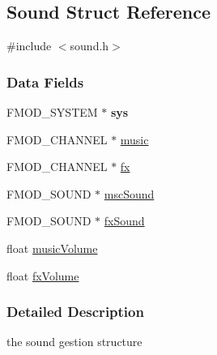 \hypertarget{struct_sound}{\subsection{Sound Struct Reference}
\label{struct_sound}
}


{\ttfamily \#include $<$sound.\-h$>$}

\subsubsection*{Data Fields}
\begin{DoxyCompactItemize}
\item 
\hypertarget{struct_sound_ae043bb23ee313709e1c605dd6c06d317}{F\-M\-O\-D\-\_\-\-S\-Y\-S\-T\-E\-M $\ast$ {\bfseries sys}}\label{struct_sound_ae043bb23ee313709e1c605dd6c06d317}

\item 
F\-M\-O\-D\-\_\-\-C\-H\-A\-N\-N\-E\-L $\ast$ \hyperlink{struct_sound_acca26c408c6140c8cdc0d8f49d31ad4a}{music}
\item 
F\-M\-O\-D\-\_\-\-C\-H\-A\-N\-N\-E\-L $\ast$ \hyperlink{struct_sound_a259d72174e26b5bb58146484cd54c1c8}{fx}
\item 
F\-M\-O\-D\-\_\-\-S\-O\-U\-N\-D $\ast$ \hyperlink{struct_sound_a1051e4654836160d314f8d49fe85ae77}{msc\-Sound}
\item 
F\-M\-O\-D\-\_\-\-S\-O\-U\-N\-D $\ast$ \hyperlink{struct_sound_a38b0d95773369da732eb81a289b52940}{fx\-Sound}
\item 
float \hyperlink{struct_sound_a6f06b572245c72c79f052b7efb89dc3b}{music\-Volume}
\item 
float \hyperlink{struct_sound_aedb4246a8bbae1c53f2f29572674b054}{fx\-Volume}
\end{DoxyCompactItemize}


\subsubsection{Detailed Description}
the sound gestion structure 

